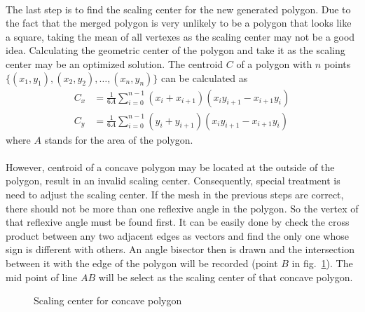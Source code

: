 \paragraph{}
The last step is to find the scaling center for the new generated polygon.
Due to the fact that the merged polygon is very unlikely to be a polygon that looks like a square, taking the mean of all vertexes as the scaling center may not be a good idea.
Calculating the geometric center of the polygon and take it as the scaling center may be an optimized solution.
The centroid $C$ of a polygon with $n$ points $\{(x_1,y_1),(x_2,y_2),\dots,(x_n,y_n)\}$ can be calculated as
\begin{equation}
    \begin{aligned}
        C_x &= \frac{1}{6A} \sum_{i=0}^{n-1}\left(
            x_i + x_{i+1}    
        \right) \left(
            x_i y_{i+1} - x_{i+1} y_i
        \right) \\
        C_y &= \frac{1}{6A} \sum_{i=0}^{n-1}\left(
            y_i + y_{i+1}    
        \right) \left(
            x_i y_{i+1} - x_{i+1} y_i
        \right)
    \end{aligned}
\end{equation}
where $A$ stands for the area of the polygon.

\paragraph{}
However, centroid of a concave polygon may be located at the outside of the polygon, result in an invalid scaling center.
Consequently, special treatment is need to adjust the scaling center.
If the mesh in the previous steps are correct, there should not be more than one reflexive angle in the polygon.
So the vertex of that reflexive angle must be found first.
It can be easily done by check the cross product between any two adjacent edges as vectors and find the only one whose sign is different with others.
An angle bisector then is drawn and the intersection between it with the edge of the polygon will be recorded (point $B$ in fig.~\ref{adap_fig:mt_concave_sc}).
The mid point of line $AB$ will be select as the scaling center of that concave polygon.

\begin{figure}[!ht]
    \centering
    \caption[Scaling center for concave polygon]{Scaling center for concave polygon}
    \label{adap_fig:mt_concave_sc}
\end{figure}

\pagebreak